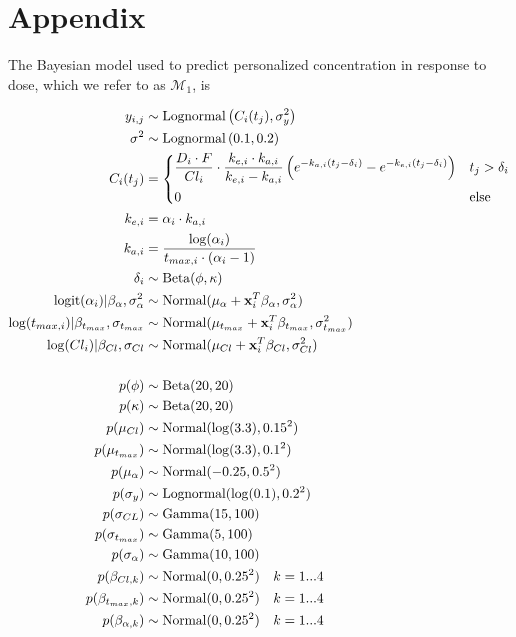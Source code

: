 \section{Appendix}\label{ap:appendix}

The Bayesian model used to predict personalized concentration in response to dose, which we refer to as $ \mathcal{M}_1 $, is 

\begin{align}\label{model_M1}
	y_{i,j} &\sim \operatorname{Lognormal}  \left(  C_i(t_j)  , \sigma^2_y \right)  \\
	\sigma^2 &\sim \operatorname{Lognormal} \left( 0.1, 0.2 \right)\\	
	C_i(t_j) &= \begin{dcases}
	\frac{D_{i} \cdot F}{C l_{i}} \cdot \frac{k_{e, i} \cdot k_{a, i}}{k_{e, i}-k_{a, i}}\left(e^{-k_{a, i}\left(t_{j}-\delta_{i}\right)}-e^{-k_{e, i}\left(t_{j}-\delta_{i}\right)}\right) & t_j>\delta_i \\
	0 & \mbox{else}
	\end{dcases}\\
	k_{e,i} &= \alpha_i \cdot k_{a,i}\\
	k_{a,i} &= \dfrac{\log(\alpha_i)}{t_{max, i}\cdot(\alpha_i-1)}\\
	\delta_i &\sim \operatorname{Beta}(\phi, \kappa) \\
	\operatorname{logit}(\alpha_i) \vert \beta_\alpha, \sigma^2_\alpha &\sim \operatorname{Normal}(\mu_\alpha + \mathbf{x}_i^T \beta_\alpha, \sigma^2_\alpha)\\
	\log(t_{max, i}) \vert \beta_{t_{max}}, \sigma_{t_{max}} &\sim \operatorname{Normal}(\mu_{t_{max}} + \mathbf{x}^T_i \beta_{t_{max}}, \sigma^2_{t_{max}}) \\
	\log(Cl_i) \vert \beta_{Cl}, \sigma_{Cl} &\sim \operatorname{Normal}(\mu_{Cl} + \mathbf{x}^T_i \beta_{Cl}, \sigma^2_{Cl}) \\ \nonumber \\
	p(\phi) &\sim \operatorname{Beta}(20, 20)\\
	p(\kappa) &\sim \operatorname{Beta}(20, 20)\\
	p(\mu_{Cl}) &\sim \operatorname{Normal}(\log(3.3), 0.15^2)\\
	p(\mu_{t_{max}}) &\sim \operatorname{Normal}(\log(3.3), 0.1^2)\\
	p(\mu_{\alpha}) &\sim \operatorname{Normal}(-0.25, 0.5^2)\\
	p(\sigma_y) &\sim \operatorname{Lognormal}(\log(0.1), 0.2^2)\\
	p(\sigma_{CL}) &\sim \operatorname{Gamma}(15, 100)\\
	p(\sigma_{t_{max}}) &\sim \operatorname{Gamma}(5, 100)\\
	p(\sigma_{\alpha}) &\sim \operatorname{Gamma}(10, 100)\\
	p(\beta_{Cl, k}) &\sim \operatorname{Normal}(0, 0.25^2) \quad k = 1 ...	 4\\
	p(\beta_{t_{max}, k}) &\sim \operatorname{Normal}(0, 0.25^2) \quad k = 1 ... 4\\	
	p(\beta_{\alpha, k}) &\sim \operatorname{Normal}(0, 0.25^2) \quad k = 1 ... 4
\end{align}

